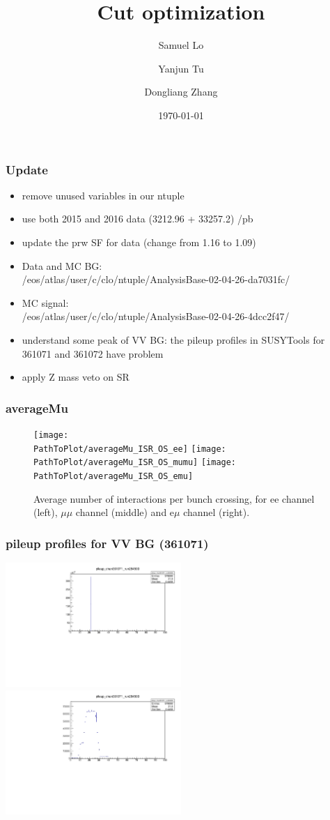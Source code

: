 \documentclass[mathserif,serif]{beamer}
\title{Cut optimization}
\author
{
Samuel Lo \inst{1}
\and
Yanjun Tu  \inst{1}
\and
Dongliang Zhang  \inst{2}
}
\institute
{
\inst{1}
The University of Hong Kong
\and
\inst{2}
University of Michigan
}
\date{\today}
\begin{document}
\frame{\titlepage}

\begin{frame}
\frametitle{Update}
\begin{itemize}
\small
\item remove unused variables in our ntuple
\item use both 2015 and 2016 data (3212.96 + 33257.2) /pb
\item update the prw SF for data (change from 1.16 to 1.09)
\item Data and MC BG: \\
/eos/atlas/user/c/clo/ntuple/AnalysisBase-02-04-26-da7031fc/
\item MC signal: \\
/eos/atlas/user/c/clo/ntuple/AnalysisBase-02-04-26-4dcc2f47/
\item understand some peak of VV BG: the pileup profiles in SUSYTools for 361071 and 361072 have problem
\item apply Z mass veto on SR
\end{itemize}
\end{frame}

\def \PathToPlot {../plot}
\begin{frame}
\frametitle{averageMu}
\begin{figure}
\texttt{[image: \\PathToPlot/averageMu\_ISR\_OS\_ee]}
\texttt{[image: \\PathToPlot/averageMu\_ISR\_OS\_mumu]}
\texttt{[image: \\PathToPlot/averageMu\_ISR\_OS\_emu]} \\
\caption{Average number of interactions per bunch crossing, for ee channel (left), $\mu\mu$ channel (middle) and e$\mu$ channel (right).}
\end{figure}
\end{frame}

\begin{frame}
\frametitle{pileup profiles for VV BG (361071)}
\includegraphics[width=0.5\textwidth]{data/photo/peak.pdf}
\includegraphics[width=0.5\textwidth]{data/photo/zoom.pdf}
\end{frame}
\end{document}
